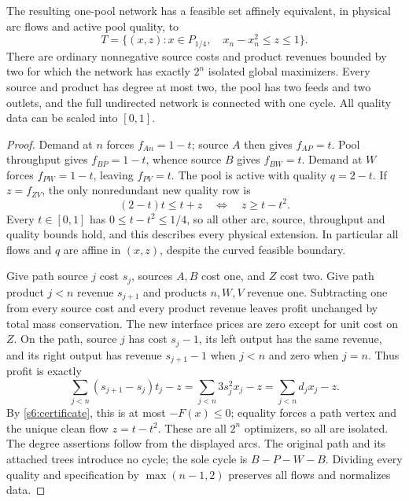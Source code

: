 \begin{theorem}\label{s6:vertex-forcing}
The resulting one-pool network has a feasible set affinely equivalent,
in physical arc flows and active pool quality, to
\begin{equation}
 T=\{(x,z):x\in P_{1/4},\quad x_n-x_n^2\le z\le1\}.
 \label{s6:T}
\end{equation}
There are ordinary nonnegative source costs and product revenues bounded
by two for which the network has exactly $2^n$ isolated global maximizers.
Every source and product has degree at most two, the pool has two feeds
and two outlets, and the full undirected network is connected with one
cycle. All quality data can be scaled into $[0,1]$.
\end{theorem}
\begin{proof}
Demand at $n$ forces $f_{An}=1-t$; source $A$ then gives $f_{AP}=t$.
Pool throughput gives $f_{BP}=1-t$, whence source $B$ gives $f_{BW}=t$.
Demand at $W$ forces $f_{PW}=1-t$, leaving $f_{PV}=t$.
The pool is active with quality $q=2-t$. If $z=f_{ZV}$, the only
nonredundant new quality row is
\[
 (2-t)t\le t+z\quad\Longleftrightarrow\quad z\ge t-t^2.
\]
Every $t\in[0,1]$ has $0\le t-t^2\le1/4$, so all other arc,
source, throughput and quality bounds hold, and this describes every
physical extension. In particular all flows and $q$ are affine in
$(x,z)$, despite the curved feasible boundary.

Give path source $j$ cost $s_j$, sources $A,B$ cost one, and $Z$ cost
two. Give path product $j<n$ revenue $s_{j+1}$ and products $n,W,V$
revenue one. Subtracting one from every source cost and every product
revenue leaves profit unchanged by total mass conservation. The new
interface prices are zero except for unit cost on $Z$. On the path,
source $j$ has cost $s_j-1$, its left output has the same revenue,
and its right output has revenue $s_{j+1}-1$ when $j<n$ and zero
when $j=n$. Thus profit is exactly
\begin{equation}
 \sum_{j<n}(s_{j+1}-s_j)t_j-z
 =\sum_{j<n}3s_j^2x_j-z=\sum_{j<n}d_jx_j-z.
 \label{s6:geometry-profit}
\end{equation}
By \cref{s6:certificate}, this is at most $-F(x)\le0$; equality forces
a path vertex and the unique clean flow $z=t-t^2$. These are all
$2^n$ optimizers, so all are isolated. The degree assertions follow from
the displayed arcs. The original path and its attached trees introduce
no cycle; the sole cycle is $B-P-W-B$. Dividing every quality and
specification by $\max(n-1,2)$ preserves all flows and normalizes data.
\end{proof}


